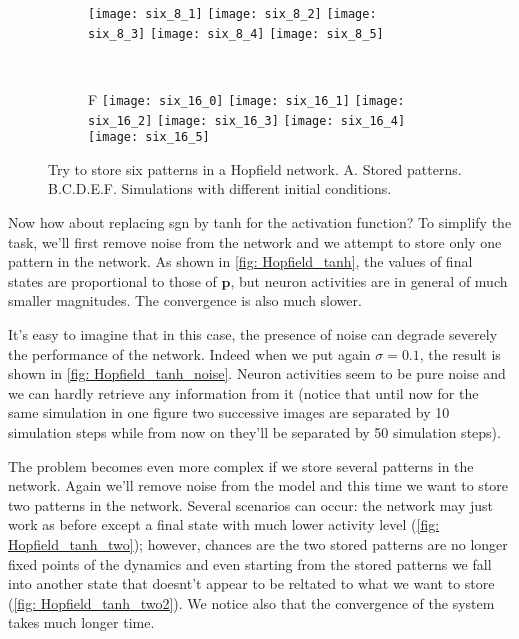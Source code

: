 \begin{figure}[H]
\begin{subfigure}{\textwidth}
    \texttt{[image: six\_8\_1]}
    \texttt{[image: six\_8\_2]}
    \texttt{[image: six\_8\_3]}
    \texttt{[image: six\_8\_4]}
    \texttt{[image: six\_8\_5]}
  \end{subfigure}\\[0.8em]
  \begin{subfigure}{\textwidth}
    \textsf{F}
    \centering
    \texttt{[image: six\_16\_0]}
    \texttt{[image: six\_16\_1]}
    \texttt{[image: six\_16\_2]}
    \texttt{[image: six\_16\_3]}
    \texttt{[image: six\_16\_4]}
    \texttt{[image: six\_16\_5]}
  \end{subfigure}
  \vspace{1.2em}
  \caption{Try to store six patterns in a Hopfield network.
           \textsf{A.} Stored patterns.
           \textsf{B.C.D.E.F.} Simulations with different initial conditions.}
  \label{fig: Hopfield_six}
\end{figure}

\vfill

\newpage

Now how about replacing sgn by tanh for the activation function? To simplify
the task, we'll first remove noise from the network and we attempt to
store only one pattern in the network. As shown in 
\autoref{fig: Hopfield_tanh},
the values of final states are proportional to those of $\mathbf{p}$,
but neuron activities are in general of much smaller magnitudes. The 
convergence is also much slower. 

It's easy to imagine that in this case, the presence of noise can degrade
severely the performance of the network. Indeed when we put again
$\sigma=0.1$, the result is shown in \autoref{fig: Hopfield_tanh_noise}. 
Neuron activities seem to be pure noise and we can hardly retrieve any
information from it (notice that until now for the same simulation in
one figure two successive images are separated by 10 simulation steps
while from now on they'll be separated by 50 simulation steps).

The problem becomes even more complex if we store several patterns in 
the network. Again we'll remove noise from the model and this time we want
to store two patterns in the network. Several scenarios can occur: the
network may just work as before except a final state with much lower 
activity level (\autoref{fig: Hopfield_tanh_two}); however, chances are
the two stored patterns are no longer fixed points of the dynamics and
even starting from the stored patterns we fall into another state that
doesnt't appear to be reltated to what we want to store 
(\autoref{fig: Hopfield_tanh_two2}). We notice also that the convergence
of the system takes much longer time.

